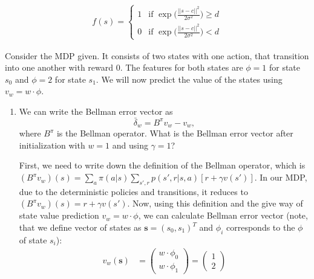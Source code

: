 \documentclass{exam}
\begin{document}
\begin{problem}
\begin{enumerate}
\begin{solutionorlines}[2in]
                \begin{align*}
                    f(s) = \begin{cases} 
                    1 &\mbox{if } \exp\big( \frac{|| s - c||^2}{2\sigma^2}\big)  \ge d \\
                    0 & \mbox{if } \exp\big( \frac{|| s - c||^2}{2\sigma^2}\big) < d \end{cases}
                \end{align*}
            \end{solutionorlines}
\end{enumerate}
\end{problem}

\begin{problem}
Consider the MDP given. It consists of two states with one action, that transition into one another with reward $0$. The features for both states are $\phi = 1$ for state $s_0$ and $\phi = 2$ for state $s_1$. We will now predict the value of the states using $v_w = w \cdot \phi$.
\begin{enumerate}
    \item We can write the Bellman error vector as
    \begin{equation}
        \bar{\delta}_w = B^{\pi} v_w - v_w,
    \end{equation}
    where $B^{\pi}$ is the Bellman operator. What is the Bellman error vector after initialization with $w=1$ and using $\gamma=1$?
    \begin{solutionorlines}[2in]
    First, we need to write down the definition of the Bellman operator, which is $(B^{\pi} v_w)(s) = \sum_a \pi(a|s) \sum_{s', r} p(s',r|s,a)[r + \gamma v(s')]$. In our MDP, due to the deterministic policies and transitions, it reduces to $(B^{\pi} v_w)(s) = r + \gamma v(s')$. Now, using this definition and the give way of state value prediction $v_w = w \cdot \phi$, we can calculate Bellman error vector (note, that we define vector of states as $\mathbf{s}=(s_0, s_1)^T$ and $\phi_i$ corresponds to the $\phi$ of state $s_i$):
    \begin{align*}
        v_w(\mathbf{s}) &= \begin{pmatrix}
        w \cdot \phi_0\\
        w \cdot \phi_1
        \end{pmatrix} = \begin{pmatrix}
        1\\
        2
        \end{pmatrix}\\

\end{align*}
\end{solutionorlines}
\end{enumerate}
\end{problem}
\end{document}
